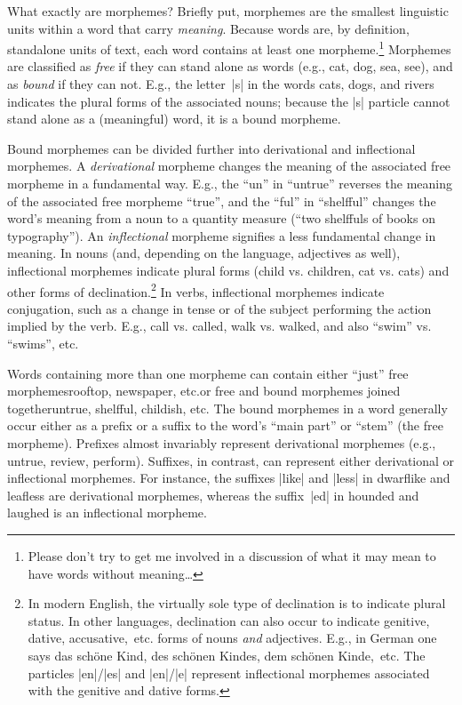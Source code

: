 \documentclass[11pt]{article}
\begin{document}
What exactly are morphemes? Briefly put, morphemes are the smallest linguistic units within a word that carry \emph{meaning}. Because words are, by definition, standalone units of text, each word contains at least one morpheme.\footnote{Please don't try to get me involved in a discussion of what it may mean to have words without meaning\dots} Morphemes are classified as \emph{free} if they can stand alone as words (e.g., cat, dog, sea, see), and as \emph{bound} if they can not. E.g., the letter~|s| in the words cats, dogs, and rivers indicates the plural forms of the associated nouns; because the |s| particle cannot stand alone as a (meaningful) word, it is a bound morpheme. 

\enlargethispage{0.5\baselineskip}

Bound morphemes can be divided further into derivational and inflectional morphemes. A \emph{derivational} morpheme changes the meaning of the associated free morpheme in a fundamental way. E.g., the \enquote{un} in \enquote{untrue} reverses the meaning of the associated free morpheme \enquote{true}, and the \enquote{ful} in \enquote{shelfful} changes the word's meaning from a noun to a quantity measure (\enquote{two shelffuls of books on typography}). 
An \emph{inflectional} morpheme signifies a less fundamental change in meaning. In nouns (and, depending on the language, adjectives as well), inflectional morphemes indicate plural forms (child vs. children, cat vs. cats) and other forms of declination.\footnote{In modern English, the virtually sole type of declination is to indicate plural status. In other languages, declination can also occur to indicate genitive, dative, accusative,~etc. forms of nouns \emph{and} adjectives. E.g., in German one says das schöne Kind, des schönen Kindes, dem schönen Kinde,~etc. The particles |en|/|es| and |en|/|e| represent inflectional morphemes associated with the genitive and dative forms.} In verbs, inflectional morphemes indicate conjugation, such as a change in tense or of the subject performing the action implied by the verb. E.g., call vs. called, walk vs. walked, and also \enquote{swim} vs. \enquote{swims}, etc. 

Words containing more than one morpheme can contain either \enquote{just} free morphemes\textemdash rooftop, newspaper, etc.\textemdash or free and bound morphemes joined together\textemdash untrue, shelfful, childish, etc. The bound morphemes in a word generally occur either as a prefix or a suffix to the word's \enquote{main part} or \enquote{stem} (the free morpheme). Prefixes almost invariably represent derivational morphemes (e.g., untrue, review, perform). Suffixes, in contrast, can represent either derivational or inflectional morphemes. For instance, the suffixes |like| and |less| in dwarflike and leafless are derivational morphemes, whereas the suffix~|ed| in hounded and laughed is an inflectional morpheme. 
\end{document}
